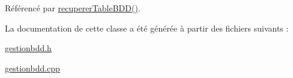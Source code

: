 Référencé par \hyperlink{class_gestion_b_d_d_a2b44ebc5bf5b1a7babde6512817a85b4}{recuperer\+Table\+B\+D\+D()}.



La documentation de cette classe a été générée à partir des fichiers suivants \+:\begin{DoxyCompactItemize}
\item 
\hyperlink{gestionbdd_8h}{gestionbdd.\+h}\item 
\hyperlink{gestionbdd_8cpp}{gestionbdd.\+cpp}\end{DoxyCompactItemize}
